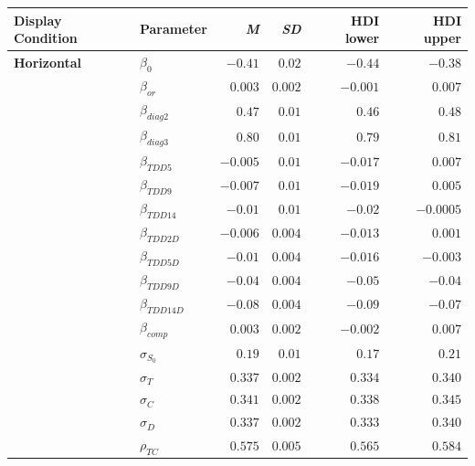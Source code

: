 \begin{table}[ht]
    \centering
    \begin{tabular}{llrrrr}
        \toprule
        Display Condition & Parameter & \textit{M} & \textit{SD} & HDI lower & HDI upper \\
        \midrule
        \textbf{Horizontal}  &  $\beta_{0}$     &    $-0.41$   &   $0.02$    &  $-0.44$     & $-0.38$     \\
                    &  $\beta_{or}$    &    $0.003$   &   $0.002$   &  $-0.001$    & $0.007$     \\
                    &  $\beta_{diag2}$ &    $0.47$    &   $0.01$    &  $0.46$      & $0.48$      \\
                    &  $\beta_{diag3}$ &    $0.80$    &   $0.01$    &  $0.79$      & $0.81$      \\
                    &  $\beta_{TDD5}$  &    $-0.005$  &   $0.01$    &  $-0.017$    & $0.007$     \\
                    &  $\beta_{TDD9}$  &    $-0.007$  &   $0.01$    &  $-0.019$    & $0.005$     \\
                    &  $\beta_{TDD14}$ &    $-0.01$   &   $0.01$    &  $-0.02$     & $-0.0005$   \\
                    &  $\beta_{TDD2D}$ &    $-0.006$  &   $0.004$   &  $-0.013$    & $0.001$     \\
                    &  $\beta_{TDD5D}$ &    $-0.01$   &   $0.004$   &  $-0.016$    & $-0.003$    \\
                    &  $\beta_{TDD9D}$ &    $-0.04$   &   $0.004$   &  $-0.05$     & $-0.04$     \\
                    &  $\beta_{TDD14D}$&    $-0.08$   &   $0.004$   &  $-0.09$     & $-0.07$     \\
                    &  $\beta_{comp}$  &    $0.003$   &   $0.002$   &  $-0.002$    & $0.007$     \\
                    &  $\sigma_{S_0}$  &    $0.19$    &   $0.01$    &  $0.17$      & $0.21$      \\
                    &  $\sigma_{T}$    &    $0.337$   &   $0.002$   &  $0.334$     & $0.340$     \\
                    &  $\sigma_{C}$    &    $0.341$   &   $0.002$   &  $0.338$     & $0.345$     \\
                    &  $\sigma_{D}$    &    $0.337$   &   $0.002$   &  $0.333$     & $0.340$     \\
                    &  $\rho_{TC}$     &    $0.575$   &   $0.005$   &  $0.565$     & $0.584$     \\

\end{tabular}
\end{table}
